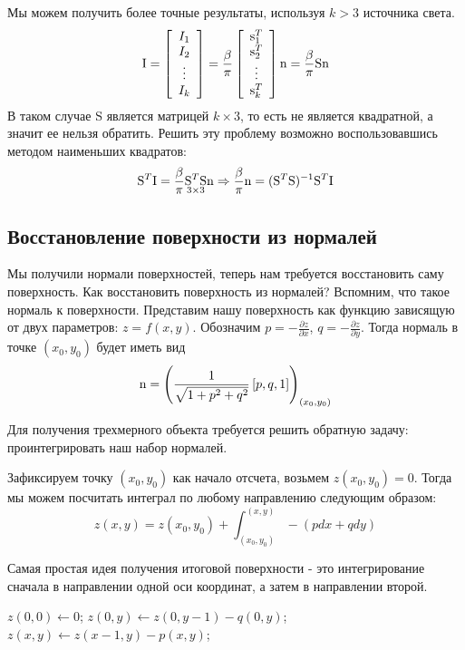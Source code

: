 Мы можем получить более точные результаты, используя $k > 3$ источника света.
\[\mathrm{I}=\left[\begin{array}{c}
      I_1 \\ I_2 \\ \vdots \\ I_k
    \end{array}\right] = \frac{\beta}{\pi}\left[\begin{array}{c}
      \mathrm{s}^T_1 \\ \mathrm{s}^T_2 \\ \vdots \\ \mathrm{s}^T_k
    \end{array}\right]\mathrm{n} = \frac{\beta}{\pi}\mathrm{S}\mathrm{n}\]
В таком случае $\mathrm{S}$ является матрицей $k\times3$, то есть не является квадратной,
а значит ее нельзя обратить. Решить эту проблему возможно воспользовавшись методом
наименьших квадратов:
\[\mathrm{S}^T\mathrm{I}=\frac{\beta}{\pi}\underset{3\times3}{\mathrm{S}^T\mathrm{S}}\mathrm{n}\Rightarrow\frac{\beta}{\pi}\mathrm{n}=(\mathrm{S}^T\mathrm{S})^{-1}\mathrm{S}^T\mathrm{I}\]

\subsection{Восстановление поверхности из нормалей}

Мы получили нормали поверхностей, теперь нам требуется восстановить саму поверхность.
Как восстановить поверхность из нормалей? Вспомним, что такое нормаль к поверхности.
Представим нашу поверхность как функцию зависящую от двух параметров: $z=f(x,y)$.
Обозначим $p=-\frac{\partial z}{\partial x}$, $q=-\frac{\partial z}{\partial y}$.
Тогда нормаль в точке $(x_0,y_0)$ будет иметь вид
\[\mathrm{n}=\left(\frac{1}{\sqrt{1+p^2+q^2}}\left[p,q,1\right]\right)_{(x_0,y_0)}\]

Для получения трехмерного объекта требуется решить обратную задачу:
проинтегрировать наш набор нормалей.

Зафиксируем точку $(x_0, y_0)$ как начало отсчета, возьмем $z(x_0,y_0)=0$.
Тогда мы можем посчитать интеграл по любому направлению следующим образом:
\[z(x,y)=z(x_0,y_0)+\int_{(x_0,y_0)}^{(x,y)}-(pdx+qdy)\]

Самая простая идея получения итоговой поверхности - это интегрирование
сначала в направлении одной оси координат, а затем в направлении второй.

\begin{algorithmic}[1]
  \State $z(0,0) \gets 0$;
  \State $z(0,y) \gets z(0,y-1)-q(0,y)$;
  \EndFor
  \State $z(x,y) \gets z(x-1,y)-p(x,y)$;
  \EndFor
  \EndFor
\end{algorithmic}

